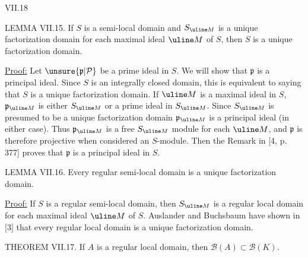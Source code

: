 VII.18

LEMMA VII.15. If $S$ is a semi-local domain and $S_{\uline M}$ is
a unique factorization domain for each maximal ideal $\uline M$ of $S$,
then $S$ is a unique factorization domain.

\uline{Proof:} Let $\unsure{\mathfrak p|\mathcal P}$ be a prime ideal in $S$. We will show that $\mathfrak p$ is
a principal ideal. Since $S$ is an integrally closed domain, this is
equivalent to saying that $S$ is a unique factorization domain. If $\uline M$
is a maximal ideal in $S$, $\mathfrak p_{\uline M}$ is either $S_{\uline M}$ or a prime ideal in $S_{\uline M}$.
Since $S_{\uline M}$ is presumed to be a unique factorization domain $\mathfrak p_{\uline M}$ is
a principal ideal (in either case). Thus $\mathfrak p_{\uline M}$ is a free $S_{\uline M}$ module
for each $\uline M$, and $\mathfrak p$ is therefore projective when considered an
$S$-module. Then the Remark in [4, p. 377] proves that $\mathfrak p$ is a
principal ideal in $S$.

LEMMA VII.16. Every regular semi-local domain is a unique
factorization domain.

\uline{Proof:} If $S$ is a regular semi-local domain, then $S_{\uline M}$ is a
regular local domain for each maximal ideal $\uline M$ of $S$. Auslander
and Buchsbaum have shown in [3] that every regular local domain is a
unique factorization domain.

THEOREM VII.17. If $A$ is a regular local domain, then
$\mathcal B(A)\subset\mathcal B(K)$.
